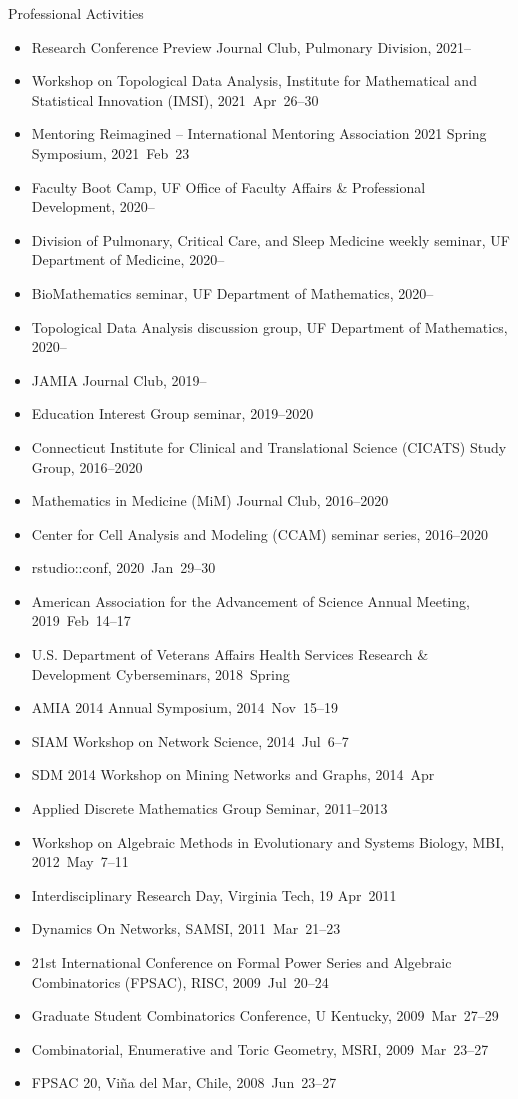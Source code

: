 \documentclass[10pt,a4paper]{article}
\begin{document}
\vspace{.25cm}
{\sc Professional Activities}
\begin{itemize}[label=$\circ$,nolistsep]
\item
Research Conference Preview Journal Club, Pulmonary Division, 2021--
\item
Workshop on Topological Data Analysis, Institute for Mathematical and Statistical Innovation (IMSI), 2021~Apr~26--30
\item
Mentoring Reimagined -- International Mentoring Association 2021 Spring Symposium, 2021~Feb~23
\item
Faculty Boot Camp, UF Office of Faculty Affairs \& Professional Development, 2020--
\item
Division of Pulmonary, Critical Care, and Sleep Medicine weekly seminar, UF Department of Medicine, 2020--
\item
BioMathematics seminar, UF Department of Mathematics, 2020--
\item
Topological Data Analysis discussion group, UF Department of Mathematics, 2020--
\item
JAMIA Journal Club, 2019--
\item
Education Interest Group seminar, 2019--2020
\item
Connecticut Institute for Clinical and Translational Science (CICATS) Study Group, 2016--2020
\item
Mathematics in Medicine (MiM) Journal Club, 2016--2020
\item
Center for Cell Analysis and Modeling (CCAM) seminar series, 2016--2020
\item
{\sffamily rstudio::conf}, 2020~Jan~29--30
\item
American Association for the Advancement of Science Annual Meeting, 2019~Feb~14--17
\item
U.S. Department of Veterans Affairs Health Services Research \& Development Cyberseminars, 2018~Spring
\item
AMIA 2014 Annual Symposium, 2014~Nov~15--19
\item
SIAM Workshop on Network Science, 2014~Jul~6--7
\item
SDM 2014 Workshop on Mining Networks and Graphs, 2014~Apr
\item
Applied Discrete Mathematics Group Seminar, 2011--2013
\item
Workshop on Algebraic Methods in Evolutionary and Systems Biology, MBI, 2012~May~7--11
\item
Interdisciplinary Research Day, Virginia Tech, 19 Apr~2011
\item
Dynamics On Networks, SAMSI, 2011~Mar~21--23
\item
21st International Conference on Formal Power Series and Algebraic Combinatorics (FPSAC), RISC, 2009~Jul~20--24
\item
Graduate Student Combinatorics Conference, U Kentucky, 2009~Mar~27--29
\item
Combinatorial, Enumerative and Toric Geometry, MSRI, 2009~Mar~23--27
\item
FPSAC 20, Vi\~{n}a del Mar, Chile, 2008~Jun~23--27
\end{itemize}
\end{document}
